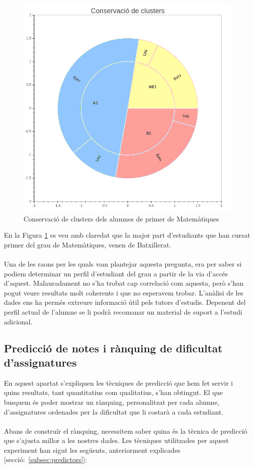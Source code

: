 \documentclass[12pt,a4paper,catalan]{article}
\begin{document}
\newpage

\begin{figure}[h]
\centering
\includegraphics[width=.6\linewidth]{img/conservacio_clusters_primer_mates.png}
\caption{Conservació de clusters dels alumnes de primer de Matemàtiques}
\label{fig:ccm1}
\end{figure}

En la Figura \ref{fig:ccm1} es veu amb claredat que la major part d'estudiants que han cursat primer del grau de Matemàtiques, venen de Batxillerat. 
\\
\\
Una de les raons per les quals vam plantejar aquesta pregunta, era per saber si podiem determinar un perfil d'estudiant del grau a partir de la via d'accés d'aquest. Malauradament no s'ha trobat cap correlació com aquesta, però s'han pogut veure resultats molt coherents i que no esperavem trobar.  L'anàlisi de les dades ens ha permès extreure informació útil pels tutors d'estudis. Depenent del perfil actual de l'alumne se li podrà recomanar un material de suport a l'estudi adicional.

\newpage

\subsection{Predicció de notes i rànquing de dificultat d'assignatures}
En aquest apartat s'expliquen  les tècniques de predicció que hem fet servir i quins resultats, tant quantitatius com qualitatius, s'han obtingut. El que busquem és poder mostrar un rànquing, personalitzat per cada alumne, d'assignatures ordenades per la dificultat que li costarà a cada estudiant.
\\
\\
Abans de construïr el rànquing, necessitem saber quina és la tècnica de predicció que s'ajusta millor a les nostres dades. Les tècniques utilitzades per aquest experiment han sigut les següents, anteriorment explicades [secció:~\ref{subsec:predictors}]:
\end{document}
